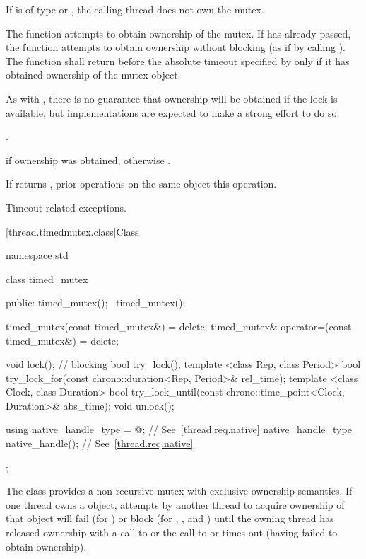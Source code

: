 \begin{itemdescr}
\pnum
\requires If  is of type  or
, the calling thread does not own the
mutex.

\pnum
\effects The function attempts to obtain ownership of the mutex. If
 has already passed, the function attempts to obtain ownership
without blocking (as if by calling ). The function shall
return before the absolute timeout specified by
 only if it has obtained ownership of the mutex object.
\begin{note} As with , there is no guarantee that ownership will
be obtained if the lock is available, but implementations are expected to make a
strong effort to do so. \end{note}

\pnum\returntype {}.

\pnum
\returns {} if ownership was obtained, otherwise .

\pnum
\sync If  returns , prior 
operations on the same object 
this operation.

\pnum\throws Timeout-related exceptions.
\end{itemdescr}

[thread.timedmutex.class]{Class }

%
\begin{codeblock}
namespace std {
  class timed_mutex {
  public:
    timed_mutex();
    ~timed_mutex();

    timed_mutex(const timed_mutex&) = delete;
    timed_mutex& operator=(const timed_mutex&) = delete;

    void lock();  // blocking
    bool try_lock();
    template <class Rep, class Period>
      bool try_lock_for(const chrono::duration<Rep, Period>& rel_time);
    template <class Clock, class Duration>
      bool try_lock_until(const chrono::time_point<Clock, Duration>& abs_time);
    void unlock();

    using native_handle_type = @\impdefnc@; // See~\ref{thread.req.native}
    native_handle_type native_handle();                // See~\ref{thread.req.native}
  };
}
\end{codeblock}

\pnum
The class  provides a non-recursive mutex with exclusive ownership
semantics. If one thread owns a  object, attempts by another thread
to acquire ownership of that object will fail (for ) or block
(for , , and ) until
the owning thread has released ownership with a call to  or the
call to  or  times out (having
failed to obtain ownership).


